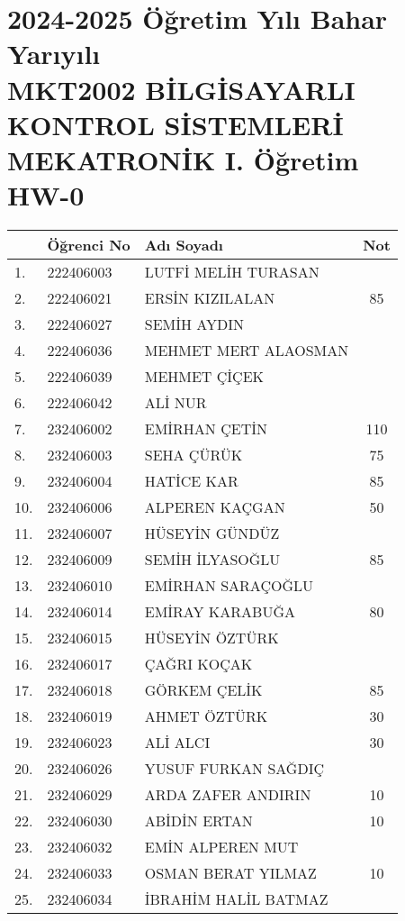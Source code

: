 \documentclass{article}
\begin{document}
\shorthandoff{=}
\section*{2024-2025 Öğretim Yılı Bahar Yarıyılı\\MKT2002 BİLGİSAYARLI KONTROL SİSTEMLERİ \\MEKATRONİK I. Öğretim\\HW-0}
\begin{tabular}{|l|l|l|c|}\hline
& \textbf{Öğrenci No}& \textbf{Adı Soyadı}& \textbf{Not}\\\hline
1.& 222406003& LUTFİ MELİH TURASAN& \\\hline
2.& 222406021& ERSİN KIZILALAN& 85\\\hline
3.& 222406027& SEMİH AYDIN& \\\hline
4.& 222406036& MEHMET MERT ALAOSMAN& \\\hline
5.& 222406039& MEHMET ÇİÇEK& \\\hline
6.& 222406042& ALİ NUR& \\\hline
7.& 232406002& EMİRHAN ÇETİN& 110\\\hline
8.& 232406003& SEHA ÇÜRÜK& 75\\\hline
9.& 232406004& HATİCE KAR& 85\\\hline
10.& 232406006& ALPEREN KAÇGAN& 50\\\hline
11.& 232406007& HÜSEYİN GÜNDÜZ& \\\hline
12.& 232406009& SEMİH İLYASOĞLU& 85\\\hline
13.& 232406010& EMİRHAN SARAÇOĞLU& \\\hline
14.& 232406014& EMİRAY KARABUĞA& 80\\\hline
15.& 232406015& HÜSEYİN ÖZTÜRK& \\\hline
16.& 232406017& ÇAĞRI KOÇAK& \\\hline
17.& 232406018& GÖRKEM ÇELİK& 85\\\hline
18.& 232406019& AHMET ÖZTÜRK& 30\\\hline
19.& 232406023& ALİ ALCI& 30\\\hline
20.& 232406026& YUSUF FURKAN SAĞDIÇ& \\\hline
21.& 232406029& ARDA ZAFER ANDIRIN& 10\\\hline
22.& 232406030& ABİDİN ERTAN& 10\\\hline
23.& 232406032& EMİN ALPEREN MUT& \\\hline
24.& 232406033& OSMAN BERAT YILMAZ& 10\\\hline
25.& 232406034& İBRAHİM HALİL BATMAZ& \\\hline

\end{tabular}
\end{document}
